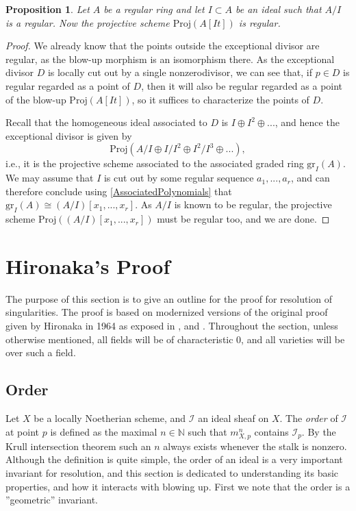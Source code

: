 \documentclass[12pt,a4paper,leqno]{article}
\newcommand{\N}{\mathbb{N}}
\newcommand{\gr}{\mathrm{gr}}
\newcommand{\proj}{\mathrm{Proj}}
\newcommand{\fref}[1]{\hyperref[{#1}]{\ref*{#1}}}
\theoremstyle{plain}
\newtheorem{prop}[theo]{Proposition}
\theoremstyle{definition}
\theoremstyle{remark}
\begin{document}
\begin{prop}
Let $A$ be a regular ring and let $I \subset A$ be an ideal such that $A/I$ is a regular. Now the projective scheme $\proj (A[It])$ is regular. 
\end{prop}
\begin{proof}
We already know that the points outside the exceptional divisor are regular, as the blow-up morphism is an isomorphism there. As the exceptional divisor $D$ is locally cut out by a single nonzerodivisor, we can see that, if $p \in D$ is regular regarded as a point of $D$, then it will also be regular regarded as a point of the blow-up $\proj (A[It])$, so it suffices to characterize the points of $D$.

Recall that the homogeneous ideal associated to $D$ is $I \oplus I^2 \oplus ...$, and hence the exceptional divisor is given by
\begin{equation*}
\proj (A/I \oplus I/I^2 \oplus I^2 / I^3 \oplus ...), 
\end{equation*}
i.e., it is the projective scheme associated to the associated graded ring $\gr_I (A)$. We may assume that $I$ is cut out by some regular sequence $a_1,...,a_r$, and can therefore conclude using \fref{AssociatedPolynomials} that $\gr_I (A) \cong (A/I)[x_1,...,x_r]$. As $A/I$ is known to be regular, the projective scheme $\proj ((A/I)[x_1,...,x_r])$ must be regular too, and we are done.
\end{proof}

\section{Hironaka's Proof}\label{HirRes}

The purpose of this section is to give an outline for the proof for resolution of singularities. The proof is based on modernized versions of the original proof given by Hironaka in 1964 as exposed in \cite{Cut}, \cite{Hau} and \cite{Kol}. Throughout the section, unless otherwise mentioned, all fields will be of characteristic 0, and all varieties will be over such a field. 

\subsection{Order}

Let $X$ be a locally Noetherian scheme, and $\mathscr{I}$ an ideal sheaf on $X$. The \emph{order} of $\mathscr{I}$ at point $p$ is defined as the maximal $n \in \N$ such that $m_{X,p}^n$ contains $\mathscr{I}_p$. By the Krull intersection theorem such an $n$ always exists whenever the stalk is nonzero. Although the definition is quite simple, the order of an ideal is a very important invariant for resolution, and this section is dedicated to understanding its basic properties, and how it interacts with blowing up. First we note that the order is a ''geometric'' invariant.
\end{document}
